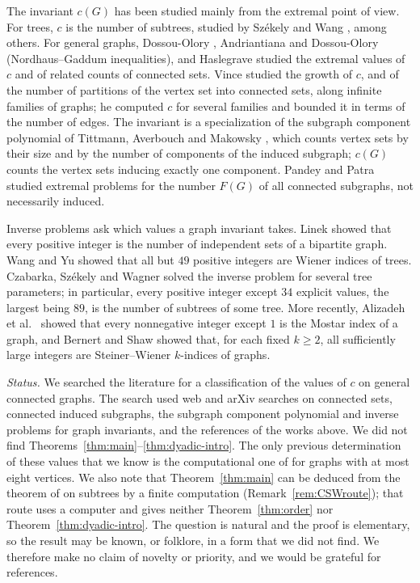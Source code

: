 \documentclass[11pt]{amsart}
\theoremstyle{definition}
\theoremstyle{remark}
\begin{document}
The invariant $c(G)$ has been studied mainly from the extremal point of view. For trees, $c$ is the number of subtrees, studied by Sz\'ekely and Wang \cite{SW}, among others. For general graphs, Dossou-Olory \cite{DO1,DO2,DO3}, Andriantiana and Dossou-Olory \cite{ADO} (Nordhaus--Gaddum inequalities), and Haslegrave \cite{Ha} studied the extremal values of $c$ and of related counts of connected sets. Vince \cite{Vi} studied the growth of $c$, and of the number of partitions of the vertex set into connected sets, along infinite families of graphs; he computed $c$ for several families and bounded it in terms of the number of edges. The invariant is a specialization of the subgraph component polynomial of Tittmann, Averbouch and Makowsky \cite{TAM}, which counts vertex sets by their size and by the number of components of the induced subgraph; $c(G)$ counts the vertex sets inducing exactly one component. Pandey and Patra \cite{PP} studied extremal problems for the number $F(G)$ of all connected subgraphs, not necessarily induced.

Inverse problems ask which values a graph invariant takes. Linek \cite{Li} showed that every positive integer is the number of independent sets of a bipartite graph. Wang and Yu \cite{WY} showed that all but $49$ positive integers are Wiener indices of trees. Czabarka, Sz\'ekely and Wagner \cite{CSW} solved the inverse problem for several tree parameters; in particular, every positive integer except $34$ explicit values, the largest being $89$, is the number of subtrees of some tree. More recently, Alizadeh et al.\ \cite{Mostar} showed that every nonnegative integer except $1$ is the Mostar index of a graph, and Bernert and Shaw \cite{BS} showed that, for each fixed $k\ge2$, all sufficiently large integers are Steiner--Wiener $k$-indices of graphs.

\emph{Status.} We searched the literature for a classification of the values of $c$ on general connected graphs. The search used web and arXiv searches on connected sets, connected induced subgraphs, the subgraph component polynomial and inverse problems for graph invariants, and the references of the works above. We did not find Theorems~\ref{thm:main}--\ref{thm:dyadic-intro}. The only previous determination of these values that we know is the computational one of \cite[Remark~3.20]{CORa} for graphs with at most eight vertices. We also note that Theorem~\ref{thm:main} can be deduced from the theorem of \cite{CSW} on subtrees by a finite computation (Remark~\ref{rem:CSWroute}); that route uses a computer and gives neither Theorem~\ref{thm:order} nor Theorem~\ref{thm:dyadic-intro}. The question is natural and the proof is elementary, so the result may be known, or folklore, in a form that we did not find. We therefore make no claim of novelty or priority, and we would be grateful for references.
\end{document}
